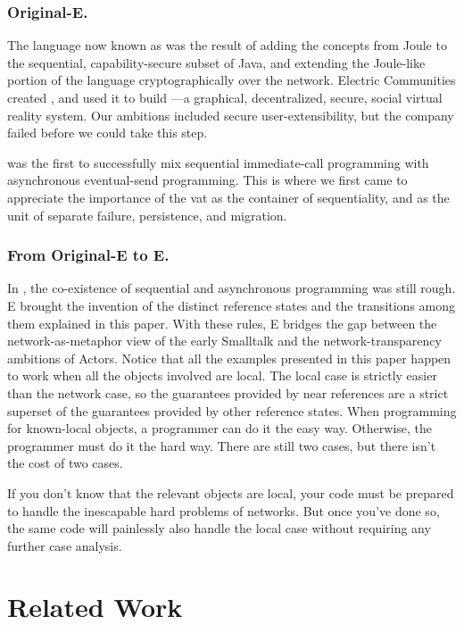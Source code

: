 \documentclass{llncs}
\begin{document}
\subsubsection{Original-E.} The language now known as
 was the result of adding the concepts from Joule to
the sequential, capability-secure subset of Java, and extending the
Joule-like portion of the language cryptographically over the
network. Electric Communities created , and used it to
build ---a graphical, decentralized, secure, social
virtual reality system. Our ambitions included secure
user-extensibility, but the company failed before we could take this
step.

 was the first to successfully mix sequential
immediate-call programming with asynchronous eventual-send
programming. This is where we first came to appreciate the importance
of the vat as the container of sequentiality, and as the unit of
separate failure, persistence, and migration.

\subsubsection{From Original-E to E.} In , the
co-existence of sequential and asynchronous programming was still
rough. E brought the invention of the distinct reference states and
the transitions among them explained in this paper. With these rules,
E bridges the gap between the network-as-metaphor view of the early
Smalltalk and the network-transparency ambitions of Actors. Notice
that all the examples presented in this paper happen to work when all
the objects involved are local. The local case is strictly easier than
the network case, so the guarantees provided by near references are a
strict superset of the guarantees provided by other reference
states. When programming for known-local objects, a programmer can do
it the easy way. Otherwise, the programmer must do it the hard
way. There are still two cases, but there isn't the cost of two cases.

If you don't know that the relevant objects are local, your code must
be prepared to handle the inescapable hard problems of networks. But
once you've done so, the same code will painlessly also handle the
local case without requiring any further case analysis.

\section{Related Work}
\end{document}
